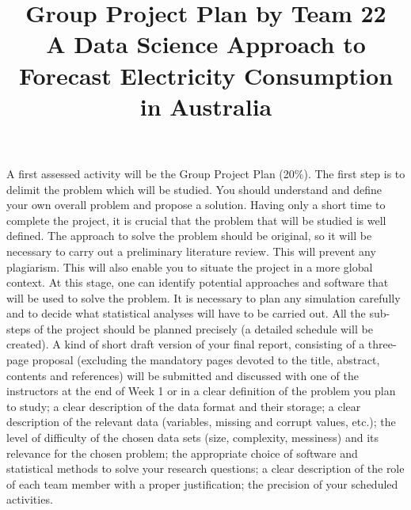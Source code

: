 \documentclass[mstat,12pt]{unswthesis}
\title{Group Project Plan by Team 22\\[0.5cm]A Data Science Approach to
Forecast Electricity Consumption in Australia}
\author{\Authornameonly}
\begin{document}
\beforepreface


A first assessed activity will be the Group Project Plan (20\%). The
first step is to delimit the problem which will be studied. You should
understand and define your own overall problem and propose a solution.
Having only a short time to complete the project, it is crucial that the
problem that will be studied is well defined. The approach to solve the
problem should be original, so it will be necessary to carry out a
preliminary literature review. This will prevent any plagiarism. This
will also enable you to situate the project in a more global context. At
this stage, one can identify potential approaches and software that will
be used to solve the problem. It is necessary to plan any simulation
carefully and to decide what statistical analyses will have to be
carried out. All the sub-steps of the project should be planned
precisely (a detailed schedule will be created). A kind of short draft
version of your final report, consisting of a three-page proposal
(excluding the mandatory pages devoted to the title, abstract, contents
and references) will be submitted and discussed with one of the
instructors at the end of Week 1 or in a clear definition of the problem
you plan to study; a clear description of the data format and their
storage; a clear description of the relevant data (variables, missing
and corrupt values, etc.); the level of difficulty of the chosen data
sets (size, complexity, messiness) and its relevance for the chosen
problem; the appropriate choice of software and statistical methods to
solve your research questions; a clear description of the role of each
team member with a proper justification; the precision of your scheduled
activities.



\afterpreface





%
%






\setcounter{chapter}{1}
\renewcommand\thesection{\arabic{section}}
\end{document}
